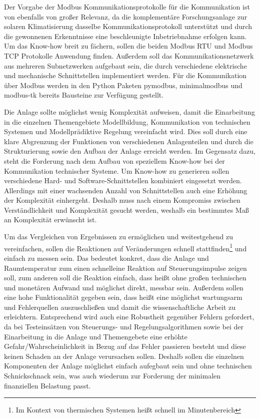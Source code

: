 Der Vorgabe der Modbus Kommunikationsprotokolle für die Kommunikation ist von ebenfalls von großer Relevanz, da die komplementäre Forschungsanlage zur solaren Klimatisierung dasselbe Kommunikationsprotokoll unterstützt und durch die gewonnenen Erkenntnisse eine beschleunigte Inbetriebnahme erfolgen kann. Um das Know-how breit zu fächern, sollen die beiden Modbus RTU und Modbus TCP Protokolle Anwendung finden. Außerdem soll das Kommunikationsnetzwerk aus mehreren Subnetzwerken aufgebaut sein, die durch verschiedene elektrische und mechanische Schnittstellen implementiert werden. Für die Kommunikation über Modbus werden in den Python Paketen pymodbus, minimalmodbus und modbus-tk bereits Bausteine zur Verfügung gestellt.

Die Anlage sollte möglichst wenig Komplexität aufweisen, damit die Einarbeitung in die einzelnen Themengebiete Modellbildung, Kommunikation von technischen Systemen und Modellprädiktive Regelung vereinfacht wird. Dies soll durch eine klare Abgrenzung der Funktionen von verschiedenen Anlagenteilen und durch die Strukturierung sowie den Aufbau der Anlage erreicht werden. %
Im Gegensatz dazu, steht die Forderung nach dem Aufbau von speziellem Know-how bei der Kommunikation technischer Systeme. Um Know-how zu generieren sollen verschiedene Hard- und Software-Schnittstellen kombiniert eingesetzt werden. Allerdings mit einer wachsenden Anzahl von Schnittstellen auch eine Erhöhung der Komplexität einhergeht.
Deshalb muss nach einem Kompromiss zwischen Verständlichkeit und Komplexität gesucht werden, weshalb ein bestimmtes Maß an Komplexität erwünscht ist.


Um das Vergleichen von Ergebnissen zu ermöglichen und weitestgehend zu vereinfachen, sollen die Reaktionen auf Veränderungen schnell stattfinden\footnote{Im Kontext von thermischen Systemen heißt schnell im Minutenbereich} und einfach zu messen sein. Das bedeutet konkret, dass die Anlage und Raumtemperatur zum einen \Gun schnell\Gob eine Reaktion auf Steuerungsimpulse zeigen soll, zum anderen soll die Reaktion einfach, dass heißt ohne großen technischen und monetären Aufwand und möglichst direkt, messbar sein. 
Außerdem sollen eine hohe Funktionalität gegeben sein, dass heißt eine möglichst wartungsarm und Fehlerquellen auszuschließen und damit die wissenschaftliche Arbeit zu erleichtern. Entsprechend wird auch eine Robustheit gegenüber Fehlern gefordert, da bei Testeinsätzen von Steuerungs- und Regelungsalgorithmen sowie bei der Einarbeitung in die Anlage und Themengebete eine erhöhte Gefahr/Wahrscheinlichkeit in Bezug auf das Fehler passieren besteht und diese keinen Schaden an der Anlage verursachen sollen. Deshalb sollen die einzelnen Komponenten der Anlage möglichst einfach aufegbaut sein und ohne technischen Schnickschnack sein, was auch wiederum zur Forderung der minimalen finanziellen Belastung passt.

